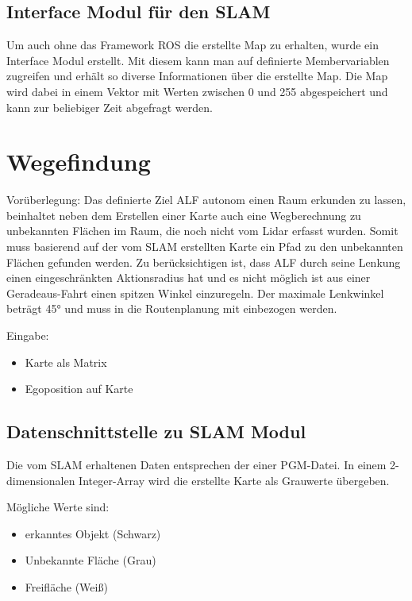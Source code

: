 \subsection{Interface Modul für den SLAM}

Um auch ohne das Framework ROS die erstellte Map zu erhalten, wurde ein Interface Modul erstellt. Mit diesem kann man auf definierte Membervariablen zugreifen und erhält so diverse Informationen über die erstellte Map. Die Map wird dabei in einem Vektor mit Werten zwischen 0 und 255 abgespeichert und kann zur beliebiger Zeit abgefragt werden. 










\section{Wegefindung}

Vorüberlegung:
Das definierte Ziel ALF autonom einen Raum erkunden zu lassen, beinhaltet neben dem Erstellen einer Karte auch eine Wegberechnung zu unbekannten Flächen im Raum, die noch nicht vom Lidar erfasst wurden. Somit muss basierend auf der vom SLAM erstellten Karte ein Pfad zu den unbekannten Flächen gefunden werden.
Zu berücksichtigen ist, dass ALF durch seine Lenkung einen eingeschränkten Aktionsradius hat und es nicht möglich ist aus einer Geradeaus-Fahrt einen spitzen Winkel einzuregeln. Der maximale Lenkwinkel beträgt 45° und muss in die Routenplanung mit einbezogen werden. 

Eingabe: 
\begin{itemize}
\item Karte als Matrix
\item Egoposition auf Karte
\end{itemize}


\subsection{Datenschnittstelle zu SLAM Modul}

Die vom SLAM erhaltenen Daten entsprechen der einer PGM-Datei. In einem 2-dimensionalen Integer-Array wird die erstellte Karte als Grauwerte übergeben. 

Mögliche Werte sind:
\begin{itemize}
\item erkanntes Objekt (Schwarz)
\item Unbekannte Fläche (Grau)
\item Freifläche (Weiß)
\end{itemize}

